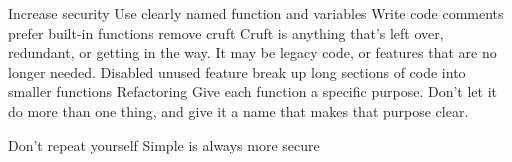 Increase security 
  Use clearly named function and variables 
  Write code comments 
  prefer built-in functions
  remove cruft 
    Cruft is anything that's left over, redundant, or getting in the way. 
    It may be legacy code, or features that are no longer needed.
  Disabled unused feature 
  break up long sections of code  into smaller functions
  Refactoring 
    Give each function a specific purpose.
    Don't let it do more than one thing, and give it a name that makes that purpose clear. 

  Don't repeat yourself
  Simple is always more secure 